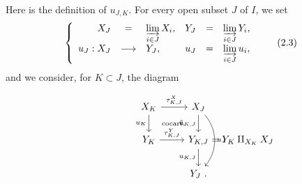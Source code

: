 \documentclass[11pt]{article}
\newcommand{\printedpage}[1]{\marginpar{\footnotesize p.~#1}}
\newcommand{\msp}[1]{\marginpar{\footnotesize [#1]}}
\begin{document}
Here is the definition of $u_{J,K}$. For every open subset $J$ of $I$, we set
\[
\left\{
\begin{array}{rclrcl}
X_J & = & \varinjlim\limits_{i\in J} X_i, & Y_J & = & \varinjlim\limits_{i\in J} Y_i,\\[2ex]
u_J : X_J & \longrightarrow & Y_J, & u_J & = & \varinjlim\limits_{i\in J} u_i,
\end{array}
\right.
\tag*{(2.3)}
\]
and we consider, for $K \subset J$, the diagram

\printedpage{15}

\msp{page 26}

\[
\begin{tikzcd}
X_K \arrow[r, "\tau^X_{K,J}"] \arrow[d, "u_K"'] \arrow[dr, phantom, "\text{\scriptsize cocart.}"] & X_J \arrow[d, "\tilde{u}_{K,J}"'] \arrow[dd, bend left=40, "u_J"] \\
Y_K \arrow[r, "\tau^Y_{K,J}"] & Y_{K,J} \rlap{$\ = Y_K \amalg_{X_K} X_J$} \arrow[d, "u_{K,J}"'] \\
 & Y_J \ .
\end{tikzcd}
\]
\end{document}
